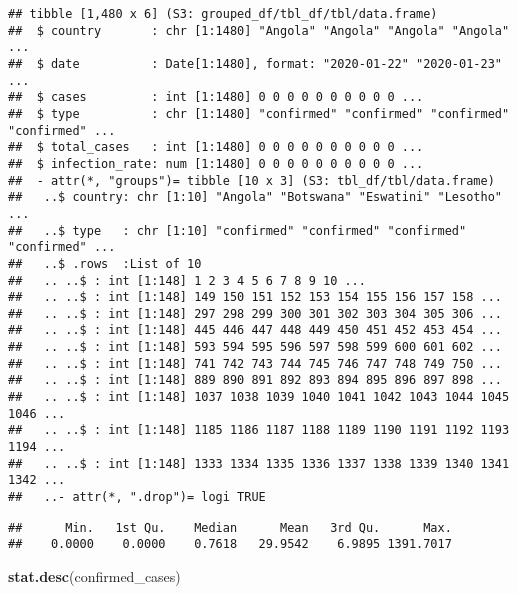 \documentclass[
]{article}
\newenvironment{Shaded}{\begin{snugshade}}{\end{snugshade}}
\newcommand{\KeywordTok}[1]{\textcolor[rgb]{0.13,0.29,0.53}{\textbf{#1}}}
\newcommand{\NormalTok}[1]{#1}
\newcommand{\OperatorTok}[1]{\textcolor[rgb]{0.81,0.36,0.00}{\textbf{#1}}}
\begin{document}
\begin{verbatim}
## tibble [1,480 x 6] (S3: grouped_df/tbl_df/tbl/data.frame)
##  $ country       : chr [1:1480] "Angola" "Angola" "Angola" "Angola" ...
##  $ date          : Date[1:1480], format: "2020-01-22" "2020-01-23" ...
##  $ cases         : int [1:1480] 0 0 0 0 0 0 0 0 0 0 ...
##  $ type          : chr [1:1480] "confirmed" "confirmed" "confirmed" "confirmed" ...
##  $ total_cases   : int [1:1480] 0 0 0 0 0 0 0 0 0 0 ...
##  $ infection_rate: num [1:1480] 0 0 0 0 0 0 0 0 0 0 ...
##  - attr(*, "groups")= tibble [10 x 3] (S3: tbl_df/tbl/data.frame)
##   ..$ country: chr [1:10] "Angola" "Botswana" "Eswatini" "Lesotho" ...
##   ..$ type   : chr [1:10] "confirmed" "confirmed" "confirmed" "confirmed" ...
##   ..$ .rows  :List of 10
##   .. ..$ : int [1:148] 1 2 3 4 5 6 7 8 9 10 ...
##   .. ..$ : int [1:148] 149 150 151 152 153 154 155 156 157 158 ...
##   .. ..$ : int [1:148] 297 298 299 300 301 302 303 304 305 306 ...
##   .. ..$ : int [1:148] 445 446 447 448 449 450 451 452 453 454 ...
##   .. ..$ : int [1:148] 593 594 595 596 597 598 599 600 601 602 ...
##   .. ..$ : int [1:148] 741 742 743 744 745 746 747 748 749 750 ...
##   .. ..$ : int [1:148] 889 890 891 892 893 894 895 896 897 898 ...
##   .. ..$ : int [1:148] 1037 1038 1039 1040 1041 1042 1043 1044 1045 1046 ...
##   .. ..$ : int [1:148] 1185 1186 1187 1188 1189 1190 1191 1192 1193 1194 ...
##   .. ..$ : int [1:148] 1333 1334 1335 1336 1337 1338 1339 1340 1341 1342 ...
##   ..- attr(*, ".drop")= logi TRUE
\end{verbatim}

\begin{Shaded}
\end{Shaded}

\begin{verbatim}
##      Min.   1st Qu.    Median      Mean   3rd Qu.      Max. 
##    0.0000    0.0000    0.7618   29.9542    6.9895 1391.7017
\end{verbatim}

\begin{Shaded}
\begin{Highlighting}[]
\KeywordTok{stat.desc}\NormalTok{(confirmed_cases)}
\end{Highlighting}
\end{Shaded}
\end{document}
